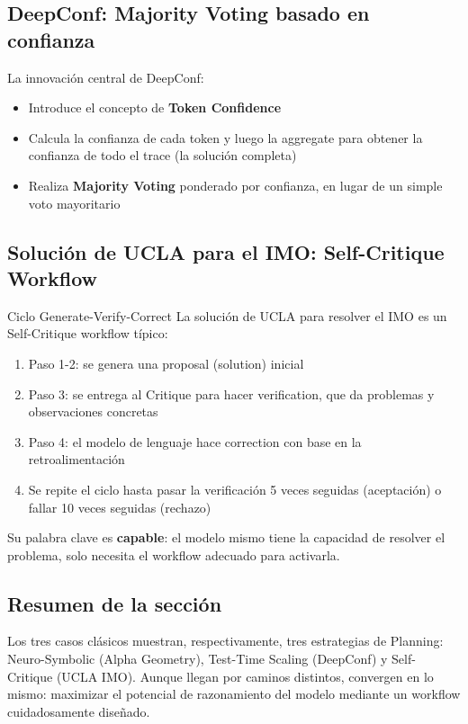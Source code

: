 \subsection{DeepConf: Majority Voting basado en confianza}

La innovación central de DeepConf:
\begin{itemize}
    \item Introduce el concepto de \textbf{Token Confidence}
    \item Calcula la confianza de cada token y luego la aggregate para obtener la confianza de todo el trace (la solución completa)
    \item Realiza \textbf{Majority Voting} ponderado por confianza, en lugar de un simple voto mayoritario
\end{itemize}

\subsection{Solución de UCLA para el IMO: Self-Critique Workflow}

\begin{importantbox}{Ciclo Generate-Verify-Correct}
La solución de UCLA para resolver el IMO es un Self-Critique workflow típico:
\begin{enumerate}
    \item Paso 1-2: se genera una proposal (solution) inicial
    \item Paso 3: se entrega al Critique para hacer verification, que da problemas y observaciones concretas
    \item Paso 4: el modelo de lenguaje hace correction con base en la retroalimentación
    \item Se repite el ciclo hasta pasar la verificación 5 veces seguidas (aceptación) o fallar 10 veces seguidas (rechazo)
\end{enumerate}
Su palabra clave es \textbf{capable}: el modelo mismo tiene la capacidad de resolver el problema, solo necesita el workflow adecuado para activarla.
\end{importantbox}

\subsection{Resumen de la sección}

Los tres casos clásicos muestran, respectivamente, tres estrategias de Planning: Neuro-Symbolic (Alpha Geometry), Test-Time Scaling (DeepConf) y Self-Critique (UCLA IMO). Aunque llegan por caminos distintos, convergen en lo mismo: maximizar el potencial de razonamiento del modelo mediante un workflow cuidadosamente diseñado.

